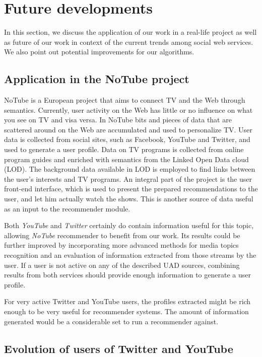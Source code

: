 \section{Future developments}
\label{sec:future}

In this section, we discuss the application of our work in a real-life project
as well as future of our work in context of the current
trends among social web services. We also point out potential improvements for
our algorithms.

\subsection{Application in the NoTube project}

NoTube is a European project that aims to connect TV and the Web through
semantics. Currently, user activity on the Web has little or no influence on
what you see on TV and visa versa. In NoTube bits and pieces of data that are
scattered around on the Web are accumulated and used to personalize TV. User data
is collected from social sites, such as Facebook, YouTube and Twitter, and used
to generate a user profile. Data on TV programs is collected from online program
guides and enriched with semantics from the Linked Open Data cloud (LOD). The
background data available in LOD is employed to find links between the user's
interests and TV programs. An integral part of the project is the user front-end
interface, which is used to present the prepared recommendations to the user,
and let him actually watch the shows. This is another source of data useful as
an input to the recommender module.

Both \textit{YouTube} and \textit{Twitter} certainly do contain information
useful for this topic, allowing \textit{NoTube} recommender to benefit from
our work. Its results could be further improved by incorporating more advanced methods
for media topics recognition and an evaluation of information extracted
from those streams by the user. If a user is not active on any of the described
UAD sources, combining results from both services should provide enough information
to generate a user profile.

For very active Twitter and YouTube users, the profiles extracted
might be rich enough to be very useful for recommender systems. The amount of
information generated would be a considerable set to run a recommender against.

\subsection{Evolution of users of Twitter and YouTube}


